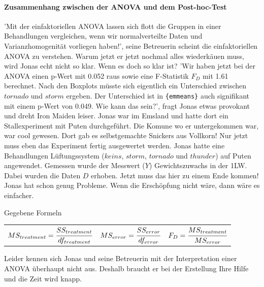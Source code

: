 \documentclass[a4paper, 9pt]{scrartcl}\usepackage[]{graphicx}\usepackage[]{xcolor}
\begin{document}
\ifcollection
\paragraph{Zusammenhang zwischen der ANOVA und dem Post-hoc-Test}
\fi

'Mit der einfaktoriellen ANOVA lassen sich flott die Gruppen in einer Behandlungen vergleichen, wenn wir normalverteilte Daten und Varianzhomogenität vorliegen haben!', seine Betreuerin scheint die einfaktoriellen ANOVA zu verstehen. Warum jetzt er jetzt nochmal alles wiederkäuen muss, wird Jonas echt nicht so klar. Wenn es doch so klar ist? 'Wir haben jetzt bei der ANOVA einen p-Wert mit 0.052 raus sowie eine F-Statistik $F_D$ mit 1.61 berechnet. Nach den Boxplots müsste sich eigentlich ein Unterschied zwischen $tornado$ und $storm$ ergeben. Der Unterschied ist in \texttt{\{emmeans\}} auch signifikant mit einem p-Wert von 0.049. Wie kann das sein?', fragt Jonas etwas provokant und dreht Iron Maiden leiser. Jonas war im Emsland und hatte dort ein Stallexperiment mit Puten durchgeführt. Die Komune wo er untergekommen war, war cool gewesen. Dort gab es selbstgemachte Snickers aus Vollkorn! Nur jetzt muss eben das Experiment fertig ausgewertet werden. Jonas hatte eine Behandlungen Lüftungssystem ($keins$, $storm$, $tornado$ und $thunder$) auf Puten angewendet. Gemessen wurde der Messwert ($Y$) Gewichtszuwachs in der 1LW. Dabei wurden die Daten $D$ erhoben. Jetzt muss das hier zu einem Ende kommen! Jonas hat schon genug Probleme. Wenn die Erschöpfung nicht wäre, dann wäre es einfacher.

\begin{graybox}{Gegebene Formeln}
\begin{center}
  \begin{tabular}{ccc}
    $MS_{treatment} = \cfrac{SS_{treatment}}{df_{treatment}}$ &
    $MS_{error} = \cfrac{SS_{error}}{df_{error}}$ &
    $F_{D} = \cfrac{MS_{treatment}}{MS_{error}}$ \\
  \end{tabular}
\end{center}
\end{graybox}

Leider kennen sich Jonas und seine Betreuerin mit der Interpretation einer ANOVA überhaupt nicht aus. Deshalb braucht er bei der Erstellung Ihre Hilfe und die Zeit wird knapp. 
\end{document}
